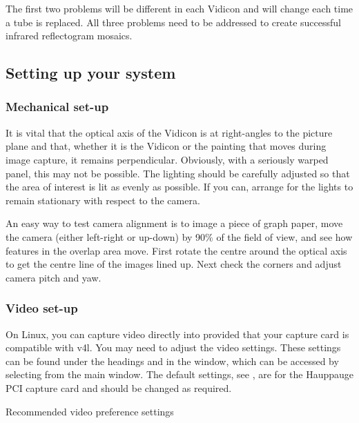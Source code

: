 The first two problems will be different in each Vidicon and will change
each time a tube is replaced. All three problems need to be addressed to
create successful infrared reflectogram mosaics.

\subsection{Setting up your system}

\subsubsection{Mechanical set-up} 

It is vital that the optical axis of the Vidicon is at right-angles to the
picture plane and that, whether it is the Vidicon or the painting that moves
during image capture, it remains perpendicular. Obviously, with a seriously
warped panel, this may not be possible. The lighting should be carefully
adjusted so that the area of interest is lit as evenly as possible. If you
can, arrange for the lights to remain stationary with respect to the camera.

An easy way to test camera alignment is to image a piece of graph paper,
move the camera (either left-right or up-down) by 90\% of the field of view,
and see how features in the overlap area move.  First rotate the centre
around the optical axis to get the centre line of the images lined up. Next
check the corners and adjust camera pitch and yaw.

\subsubsection{Video set-up} 

On Linux, you can capture video directly into \nip{} provided that your
capture card is compatible with v4l. You may need to adjust the \nip{}
video settings.  These settings can be found under the headings  and  in the  window,
which can be accessed by selecting  from the main
\nip{} window.  The default settings, see , are for the
Hauppauge PCI capture card and should be changed as required.

\begin{fig2}
\caption{Recommended video preference settings}
\end{fig2}

